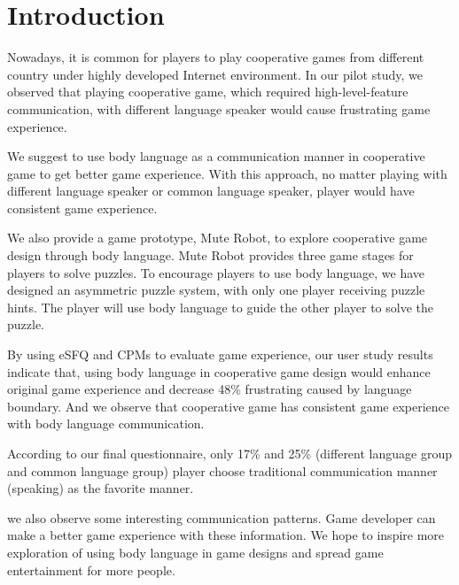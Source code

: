 \section{Introduction}

Nowadays, it is common for players to play cooperative games from different country under highly developed Internet environment. 
In our pilot study, we observed that playing cooperative game, which required high-level-feature communication, with different language speaker would cause frustrating game experience.

We suggest to use body language as a communication manner in cooperative game to get better game experience. With this approach, no matter playing with different language speaker or common language speaker, player would have consistent game experience. 

We also provide a game prototype, Mute Robot, to explore cooperative game design through body language. Mute Robot provides three game stages for players to solve puzzles.
To encourage players to use body language, we have designed an asymmetric puzzle system, with only one player receiving puzzle hints. The player will use body language to guide the other player to solve the puzzle.

By using eSFQ\cite{eSFQ} and CPMs\cite{CPMs} to evaluate game experience, our user study results indicate that, using body language in cooperative game design would enhance original game experience and decrease 48\% frustrating caused by language boundary. And we observe that cooperative game has consistent game experience with body language communication.

According to our final questionnaire, only 17\% and 25\% (different language group and common language group) player choose traditional communication manner (speaking) as the favorite manner.

we also observe some interesting communication patterns. Game developer can make a better game experience with these information. We hope to inspire more exploration of using body language in game designs and spread game entertainment for more people.


